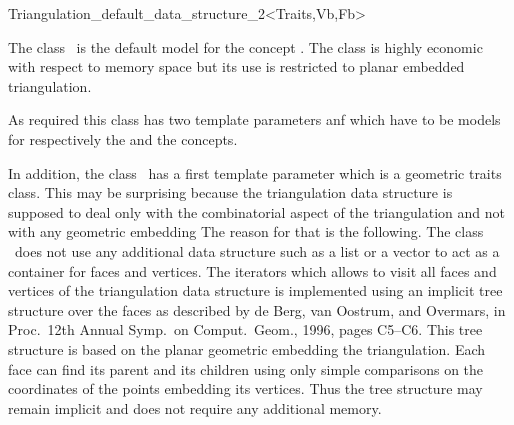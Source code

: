 

\begin{ccRefClass}{Triangulation_default_data_structure_2<Traits,Vb,Fb>} 


\ccDefinition
  
The class \ccRefName\ is the default model for the concept
.
The class \ccRefName 
is highly economic with respect to memory space but its use is
restricted
to planar embedded triangulation.

As required this class has two template parameters  anf 
which have 
to be models for respectively the
 and 
the  concepts.

In addition, the class \ccClassTemplateName\ has a first template parameter
which is a geometric traits class. This may be surprising because
the triangulation data structure is supposed to deal only with the combinatorial
aspect of the triangulation and not with any geometric embedding
The reason for that is the following.
The class \ccRefName\ does not use any additional data structure
such as a list or a vector to act as a container for faces and vertices.
The iterators which allows to visit all faces and vertices of the
triangulation
data structure
is implemented using  an implicit tree structure over the faces
as described by
 de Berg, van Oostrum, and Overmars, 
in Proc.\ 12th Annual Symp.\ on Comput.\ Geom.,
1996, pages C5--C6. This tree structure is  based on the planar
geometric embedding
the triangulation. Each face 
 can find its parent 
and its children using only simple comparisons on the
coordinates of the points embedding its vertices.
Thus the tree structure may remain implicit 
and does not require any additional memory. 


\end{ccRefClass}
